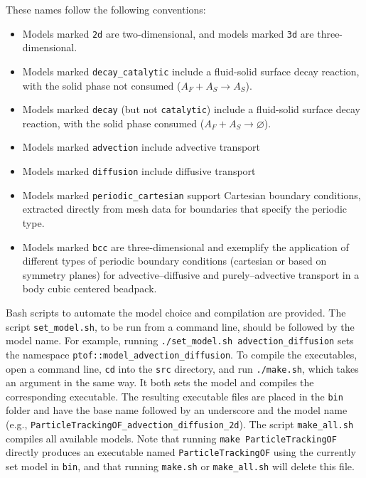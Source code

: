 \documentclass[11pt]{article}
\begin{document}
These names follow the following conventions:
%
\begin{itemize}
\item Models marked \lstinline{2d} are two-dimensional, and models marked \lstinline{3d} are three-dimensional.
\item Models marked \lstinline{decay_catalytic} include a fluid-solid surface decay reaction, with the solid phase not consumed ($A_F+A_S\to A_S$).
\item Models marked \lstinline{decay} (but not \lstinline{catalytic}) include a fluid-solid surface decay reaction, with the solid phase consumed ($A_F+A_S\to \varnothing$).
\item Models marked \lstinline{advection} include advective transport
\item Models marked \lstinline{diffusion} include diffusive transport
\item Models marked \lstinline{periodic_cartesian} support Cartesian boundary conditions, extracted directly from mesh data for boundaries that specify the periodic type.
\item Models marked \lstinline{bcc} are three-dimensional and exemplify the application of different types of periodic boundary conditions (cartesian or based on symmetry planes) for advective--diffusive and purely--advective transport in a body cubic centered beadpack.
\end{itemize}

Bash scripts to automate the model choice and compilation are provided. The script \lstinline{set_model.sh}, to be run from a command line, should be followed by the model name. For example, running \lstinline{./set_model.sh advection_diffusion} sets the namespace \lstinline{ptof::model_advection_diffusion}. To compile the executables, open a command line, \lstinline{cd} into the \lstinline{src} directory, and run \lstinline{./make.sh}, which takes an argument in the same way. It both sets the model and compiles the corresponding executable. The resulting executable files are placed in the \lstinline{bin} folder and have the base name followed by an underscore and the model name (e.g., \lstinline{ParticleTrackingOF_advection_diffusion_2d}). The script \lstinline{make_all.sh} compiles all available models. Note that running \lstinline{make ParticleTrackingOF} directly produces an executable named \lstinline{ParticleTrackingOF} using the currently set model in \lstinline{bin}, and that running \lstinline{make.sh} or \lstinline{make_all.sh} will delete this file.
\end{document}
